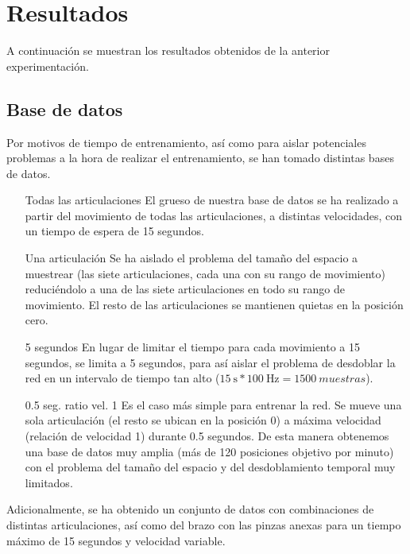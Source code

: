 \section{Resultados}
A continuación se muestran los resultados obtenidos de la anterior experimentación.
\subsection{Base de datos}
Por motivos de tiempo de entrenamiento, así como para aislar potenciales problemas a la hora de realizar el entrenamiento, se han tomado distintas bases de datos.

\begin{itemize}
\item [Todas las articulaciones] El grueso de nuestra base de datos se ha realizado a partir del movimiento de todas las articulaciones, a distintas velocidades, con un tiempo de espera de 15 segundos.
\item [Una articulación] Se ha aislado el problema del tamaño del espacio a muestrear (las siete articulaciones, cada una con su rango de movimiento) reduciéndolo a una de las siete articulaciones en todo su rango de movimiento. El resto de las articulaciones se mantienen quietas en la posición cero.
\item [5 segundos] En lugar de limitar el tiempo para cada movimiento a 15 segundos, se limita a 5 segundos, para así aislar el problema de desdoblar la red en un intervalo de tiempo tan alto 
($\SI{15}{\second} * \SI{100}{\hertz} = \SI{1500}{muestras}$).
\item [0.5 seg. ratio vel. 1] Es el caso más simple para entrenar la red. Se mueve una sola articulación (el resto se ubican en la posición 0) a máxima velocidad (relación de velocidad 1) durante 0.5 segundos. De esta manera obtenemos una base de datos muy amplia (más de 120 posiciones objetivo por minuto) con el problema del tamaño del espacio y del desdoblamiento temporal muy limitados.
\end{itemize}

Adicionalmente, se ha obtenido un conjunto de datos con combinaciones de distintas articulaciones, así como del brazo con las pinzas anexas para un tiempo máximo de 15 segundos y velocidad variable.